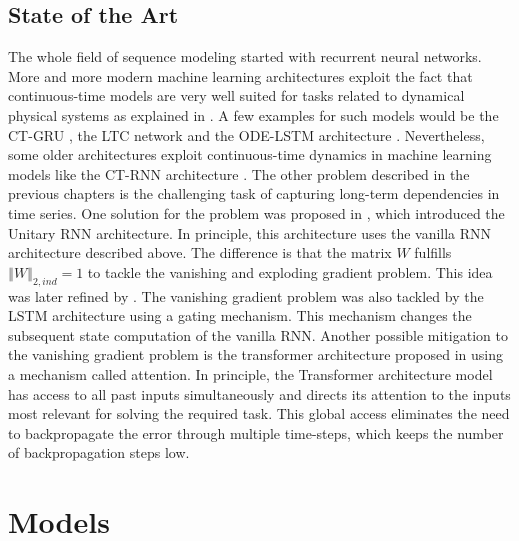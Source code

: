 \documentclass[draft,final]{vutinfth} %
\begin{document}
    \section{State of the Art}
    The whole field of sequence modeling started with recurrent neural networks.
    More and more modern machine learning architectures exploit the fact that continuous-time models are very well suited for tasks related to dynamical physical systems as explained in .
    A few examples for such models would be the CT-GRU \cite{CTGRU}, the LTC network \cite{LTCNetworks} and the ODE-LSTM architecture \cite{ODELSTM}.
    Nevertheless, some older architectures exploit continuous-time dynamics in machine learning models like the CT-RNN architecture \cite{CTRNN}.
    The other problem described in the previous chapters is the challenging task of capturing long-term dependencies in time series.
    One solution for the problem was proposed in \cite{UnitaryRNNs}, which introduced the Unitary RNN architecture.
    In principle, this architecture uses the vanilla RNN architecture described above. The difference is that the matrix $W$ fulfills $\left\Vert W \right\Vert_{2,ind} = 1$ to tackle the vanishing and exploding gradient problem.
    This idea was later refined by \cite{EfficientUnitaryRNNs}.
    The vanishing gradient problem was also tackled by the LSTM architecture \cite{LSTM} using a gating mechanism.
    This mechanism changes the subsequent state computation of the vanilla RNN.
    Another possible mitigation to the vanishing gradient problem is the transformer architecture proposed in \cite{Transformer} using a mechanism called attention.
    In principle, the Transformer architecture model has access to all past inputs simultaneously and directs its attention to the inputs most relevant for solving the required task.
    This global access eliminates the need to backpropagate the error through multiple time-steps, which keeps the number of backpropagation steps low.



    \chapter{Models}
\end{document}
